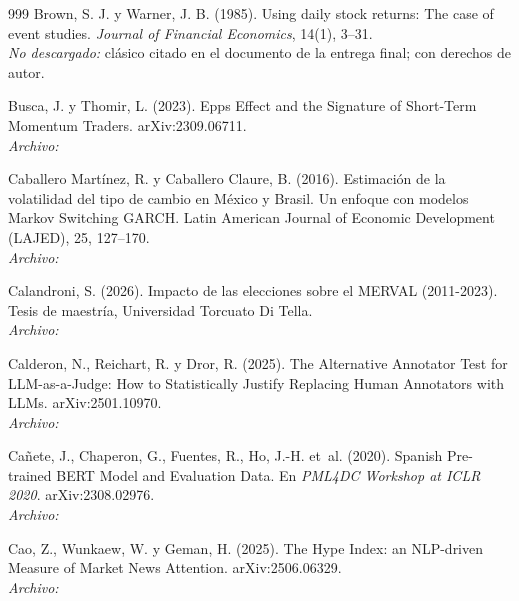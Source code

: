 \begin{thebibliography}{999}
Brown, S. J. y Warner, J. B. (1985). Using daily stock returns: The case of event studies. \emph{Journal of Financial Economics}, 14(1), 3--31.
\\\textit{No descargado:} clásico citado en el documento de la entrega final; con derechos de autor.

Busca, J. y Thomir, L. (2023). Epps Effect and the Signature of Short-Term Momentum Traders. arXiv:2309.06711.
\\\textit{Archivo:} 

Caballero Martínez, R. y Caballero Claure, B. (2016). Estimación de la volatilidad del tipo de cambio en México y Brasil. Un enfoque con modelos Markov Switching GARCH. Latin American Journal of Economic Development (LAJED), 25, 127–170.
\\\textit{Archivo:} 

Calandroni, S. (2026). Impacto de las elecciones sobre el MERVAL (2011-2023). Tesis de maestría, Universidad Torcuato Di Tella.
\\\textit{Archivo:} 

Calderon, N., Reichart, R. y Dror, R. (2025). The Alternative Annotator Test for {LLM}-as-a-Judge: How to Statistically Justify Replacing Human Annotators with {LLMs}. arXiv:2501.10970.
\\\textit{Archivo:} 

Ca{\~n}ete, J., Chaperon, G., Fuentes, R., Ho, J.-H. et~al. (2020). Spanish Pre-trained {BERT} Model and Evaluation Data. En \emph{PML4DC Workshop at ICLR 2020}. arXiv:2308.02976.
\\\textit{Archivo:} 

Cao, Z., Wunkaew, W. y Geman, H. (2025). The Hype Index: an {NLP}-driven Measure of Market News Attention. arXiv:2506.06329.
\\\textit{Archivo:} 


\end{thebibliography}
